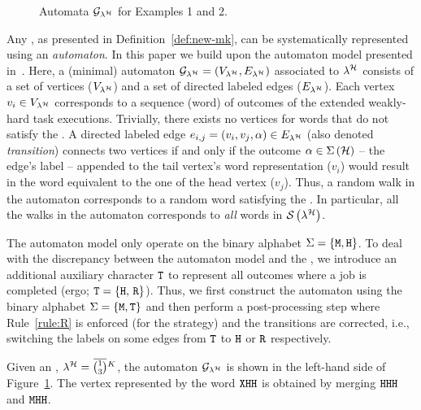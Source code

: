 \begin{figure}[t]
    \caption{Automata $\mathcal{G}_{\lambda^{\mathcal{H}}}$ for Examples 1 and 2.}
    \label{fig:min-graph}
\end{figure}
%
Any \ewhc{}, as presented in Definition~\ref{def:new-mk}, can be systematically represented using an \emph{automaton}.
In this paper we build upon the \tool{} automaton model presented in~{\cite{Vreman:2022}}.
Here, a (minimal) automaton $\mathcal{G}_{\lambda^{\mathcal{H}}} = \left(V_{\lambda^{\mathcal{H}}}, E_{\lambda^{\mathcal{H}}}\right)$ associated to $\lambda^{\mathcal{H}}$ consists of a set of vertices ($V_{\lambda^{\mathcal{H}}}$) and a set of directed labeled edges ($E_{\lambda^{\mathcal{H}}}$). 
Each vertex $v_i \in V_{\lambda^{\mathcal{H}}}$ corresponds to a sequence (word) of outcomes of the extended weakly-hard task executions. 
Trivially, there exists no vertices for words that do not satisfy the \ewhc{}.
A directed labeled edge $e_{i, j} = \left(v_i, v_j, \alpha \right) \in E_{\lambda^{\mathcal{H}}}$ (also denoted \emph{transition}) connects two vertices if and only if the outcome $\alpha \in \Sigma\left(\mathcal{H}\right)$ -- the edge's label -- appended to the tail vertex's word representation ($v_i$) would result in the word equivalent to the one of the head vertex ($v_j$).
Thus, a random walk in the automaton corresponds to a random word satisfying the \ewhc{}.
In particular, all the walks in the automaton corresponds to \emph{all} words in $\mathcal{S}_{}\left( \lambda^{\mathcal{H}} \right)$.

The \tool{} automaton model only operate on the binary alphabet $\Sigma = \left\{\texttt{M}, \texttt{H}\right\}$. 
To deal with the discrepancy between the \tool{} automaton model and the \ewhc{}, we introduce an additional auxiliary character $\texttt{T}$ to represent all outcomes where a job is completed (ergo; $\texttt{T} = \left\{ \texttt{H},\, \texttt{R} \right\}$).
Thus, we first construct the automaton using the binary alphabet $\Sigma = \{\texttt{M}, \texttt{T}\}$ and then perform a post-processing step where Rule~\ref{rule:R} is enforced (for the \tS{} strategy) and the transitions are corrected, i.e., switching the labels on some edges from $\texttt{T}$ to $\texttt{H}$ or $\texttt{R}$ respectively. 

\begin{example}%
    \label{ex:auto-kill}%
    Given an \ewhc{}, $\lambda^{\strat} = \overbar{\binom{1}{3}}^{K}$, the automaton $\mathcal{G}_{\lambda^{\mathcal{H}}}$ is shown in the left-hand side of Figure~\ref{fig:min-graph}.
    The vertex represented by the word $\texttt{X}\texttt{H}\texttt{H}$ is obtained by merging $\texttt{H}\texttt{H}\texttt{H}$ and $\texttt{M}\texttt{H}\texttt{H}$.
\end{example}

